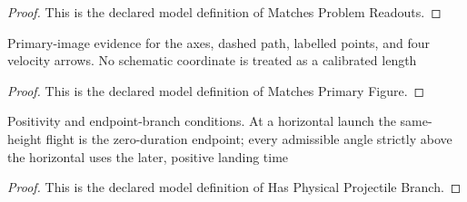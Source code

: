 \begin{proof}
  This is the declared model definition of Matches Problem Readouts.
\end{proof}
\begin{definition}
  \label{def:physics:phyx-mini-0796:phyxminiproblems-problemphyxmini0796-matchesprimaryfigure}
  Primary-image evidence for the axes, dashed path, labelled points, and four velocity arrows. No schematic coordinate is treated as a calibrated length
\end{definition}
\begin{proof}
  This is the declared model definition of Matches Primary Figure.
\end{proof}
\begin{definition}
  \label{def:physics:phyx-mini-0796:phyxminiproblems-problemphyxmini0796-hasphysicalprojectilebranch}
  Positivity and endpoint-branch conditions. At a horizontal launch the same-height flight is the zero-duration endpoint; every admissible angle strictly above the horizontal uses the later, positive landing time
\end{definition}
\begin{proof}
  This is the declared model definition of Has Physical Projectile Branch.
\end{proof}
